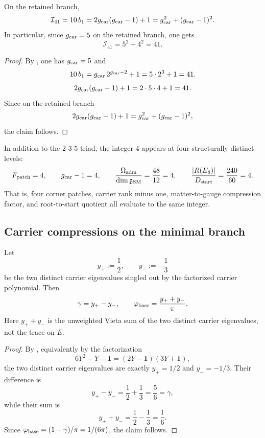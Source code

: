 \begin{corollary}
\label{cor:pythagorean-integrity-index}
On the retained branch,
\[
\mathcal I_{41}
=
10\,b_1
=
2g_{\mathrm{car}}(g_{\mathrm{car}}-1)+1
=
g_{\mathrm{car}}^2+(g_{\mathrm{car}}-1)^2.
\]
In particular, since $g_{\mathrm{car}}=5$ on the retained branch, one gets
\[
\mathcal I_{41}=5^2+4^2=41.
\]
\end{corollary}

\begin{proof}
By , one has $g_{\mathrm{car}}=5$ and
\[
10\,b_1=g_{\mathrm{car}}\,2^{g_{\mathrm{car}}-2}+1=5\cdot 2^3+1=41.
\]
\[
2g_{\mathrm{car}}(g_{\mathrm{car}}-1)+1=2\cdot 5\cdot 4+1=41.
\]
Since on the retained branch
\[
2g_{\mathrm{car}}(g_{\mathrm{car}}-1)+1=g_{\mathrm{car}}^2+(g_{\mathrm{car}}-1)^2,
\]
the claim follows.
\end{proof}

\begin{remark}
In addition to the $2$-$3$-$5$ triad, the integer $4$ appears at four structurally distinct levels:
\[
F_{\mathrm{patch}}=4,
\qquad
g_{\mathrm{car}}-1=4,
\qquad
\frac{\Omega_{\mathrm{adm}}}{\dim\mathfrak g_{\mathrm{SM}}}=\frac{48}{12}=4,
\qquad
\frac{|R(E_8)|}{D_{\mathrm{start}}}=\frac{240}{60}=4.
\]
That is, four corner patches, carrier rank minus one, matter-to-gauge compression factor, and root-to-start quotient all evaluate to the same integer.
\end{remark}

\subsection{Carrier compressions on the minimal branch}

\begin{corollary}
Let
\[
y_+:=\frac12,
\qquad
y_-:=-\frac13
\]
be the two distinct carrier eigenvalues singled out by the factorized carrier polynomial. Then
\[
\gamma=y_+-y_-,
\qquad
\varphi_{\mathrm{base}}=\frac{y_++y_-}{\pi}.
\]
Here $y_++y_-$ is the unweighted Vieta sum of the two distinct carrier eigenvalues, not the trace on $E$.
\end{corollary}

\begin{proof}
By , equivalently by the factorization
\[
6Y^2-Y-\mathbf 1=(2Y-\mathbf 1)(3Y+\mathbf 1),
\]
the two distinct carrier eigenvalues are exactly $y_+=1/2$ and $y_-=-1/3$. Their difference is
\[
y_+-y_-=\frac12+\frac13=\frac56=\gamma,
\]
while their sum is
\[
y_++y_-=\frac12-\frac13=\frac16.
\]
Since $\varphi_{\mathrm{base}}=(1-\gamma)/\pi=1/(6\pi)$, the claim follows.
\end{proof}

